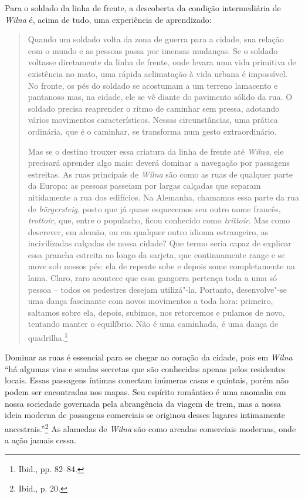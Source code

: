 Para o soldado da linha de frente, a descoberta da condição
intermediária de \textit{Wilna} é, acima de tudo, uma experiência de aprendizado:

\begin{quote}
Quando um soldado volta da zona de guerra para a cidade, sua relação com
o mundo e as pessoas passa por imensas mudanças. Se o soldado voltasse
diretamente da linha de frente, onde levara uma vida primitiva de
existência no mato, uma rápida aclimatação à vida urbana é impossível.
No fronte, os pés do soldado se acostumam a um terreno lamacento e
pantanoso mas, na cidade, ele se vê diante do pavimento sólido da rua. O
soldado precisa reaprender o ritmo de caminhar sem pressa, adotando
vários movimentos característicos. Nessas circunstâncias, uma prática
ordinária, que é o caminhar, se transforma num gesto extraordinário.

Mas se o destino trouxer essa criatura da linha de frente até \textit{Wilna}, ele
precisará aprender algo mais: deverá dominar a navegação por passagens
estreitas. As ruas principais de \textit{Wilna} são como as ruas de qualquer
parte da Europa: as pessoas passeiam por largas calçadas que separam
nitidamente a rua dos edifícios. Na Alemanha, chamamos essa parte da rua
de \textit{bürgersteig}, posto que já quase esquecemos seu outro nome
francês, \textit{trottoir}, que, entre o populacho, ficou conhecido como
\textit{trittoir}. Mas como descrever, em alemão, ou em qualquer outro idioma
estrangeiro, as incivilizadas calçadas de nossa cidade? Que termo seria
capaz de explicar essa prancha estreita ao longo da sarjeta, que
continuamente range e se move sob nossos pés: ela de repente sobe e
depois some completamente na lama. Claro, raro acontece que essa
gangorra pertença toda a uma só pessoa -- todos os pedestres desejam
utilizá"-la. Portanto, desenvolve"-se uma dança fascinante com novos
movimentos a toda hora: primeiro, saltamos sobre ela, depois, subimos,
nos retorcemos e pulamos de novo, tentando manter o equilíbrio. Não é
uma caminhada, é uma dança de quadrilha.\footnote{Ibid., pp. 82--84.}
\end{quote}


Dominar as ruas é essencial para se chegar ao coração da cidade, pois em
\textit{Wilna} ``há algumas vias e sendas secretas que são conhecidas apenas
pelos residentes locais. Essas passagens íntimas conectam inúmeras casas
e quintais, porém não podem ser encontradas nos mapas. Seu espírito
romântico é uma anomalia em nossa sociedade governada pela abrangência
da viagem de trem, mas a nossa ideia moderna de passagens comerciais se
originou desses lugares intimamente ancestrais.''\footnote{Ibid., p. 20.}
As alamedas de \textit{Wilna} são como arcadas comerciais modernas, onde a ação
jamais cessa.

